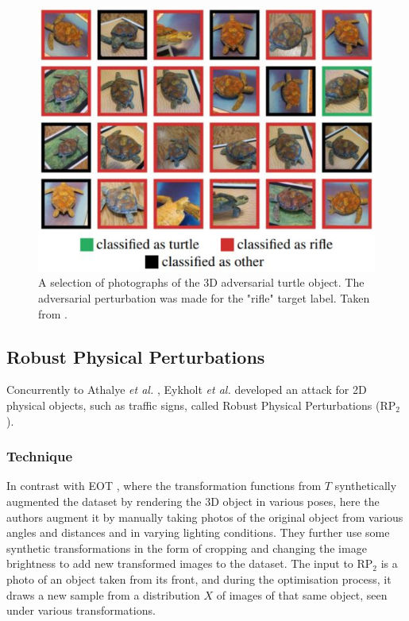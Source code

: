 \begin{figure}[h]
    \centering
    \includegraphics[width=1\textwidth]{graphics/turtle.JPG}
    \caption{A selection of photographs of the 3D adversarial turtle object. The adversarial perturbation was made for the "rifle" target label. Taken from \cite{athalye}.}
    \label{fig:3d_turtle}
\end{figure}

\subsection{Robust Physical Perturbations}

Concurrently to Athalye \textit{et al.} \cite{athalye}, Eykholt \textit{et al.} \cite{evtimov_road_signs} developed an attack for 2D physical objects, such as traffic signs, called Robust Physical Perturbations ($\textrm{RP}_2$).

\subsubsection{Technique}

In contrast with EOT \cite{athalye}, where the transformation functions from $T$ synthetically augmented the dataset by rendering the 3D object in various poses, here the authors augment it by manually taking photos of the original object from various angles and distances and in varying lighting conditions. They further use some synthetic transformations in the form of cropping and changing the image brightness to add new transformed images to the dataset. The input to $\textrm{RP}_2$ is a photo of an object taken from its front, and during the optimisation process, it draws a new sample from a distribution $X$ of images of that same object, seen under various transformations.

